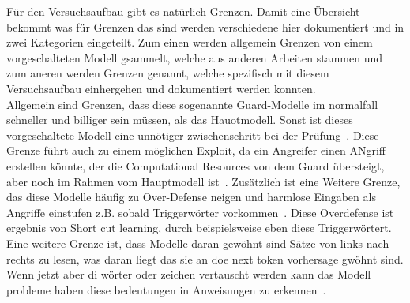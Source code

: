 Für den Versuchsaufbau gibt es natürlich Grenzen. Damit eine Übersicht bekommt was für Grenzen das sind werden verschiedene hier dokumentiert und in zwei Kategorien
eingeteilt. Zum einen werden allgemein Grenzen von einem vorgeschalteten Modell gsammelt, welche aus anderen Arbeiten stammen und zum aneren werden Grenzen genannt,
welche spezifisch mit diesem Versuchsaufbau einhergehen und dokumentiert werden konnten. \\
Allgemein sind Grenzen, dass diese sogenannte Guard-Modelle im normalfall schneller und billiger sein müssen, als das Hauotmodell. Sonst ist dieses vorgeschaltete
Modell eine unnötiger zwischenschritt bei der Prüfung~\cite[1]{sm36}.
Diese Grenze führt auch zu einem möglichen Exploit, da ein Angreifer einen ANgriff erstellen könnte, der die Computational Resources von dem Guard übersteigt, aber
noch im Rahmen vom Hauptmodell ist~\cite[2]{sm36}. Zusätzlich ist eine Weitere Grenze, das diese Modelle häufig zu Over-Defense neigen und harmlose Eingaben als Angriffe 
einstufen z.B. sobald Triggerwörter vorkommen~\cite[1\psq]{sm37}.
Diese Overdefense ist ergebnis von Short cut learning, durch beispielsweise eben diese Triggerwörtert. 
Eine weitere Grenze ist, dass Modelle daran gewöhnt sind Sätze von links nach rechts zu lesen, was daran liegt das sie an doe next token vorhersage gwöhnt sind. 
Wenn jetzt aber di wörter oder zeichen vertauscht werden kann das Modell probleme haben diese bedeutungen in Anweisungen zu erkennen~\cite[4]{sm38}. \\

